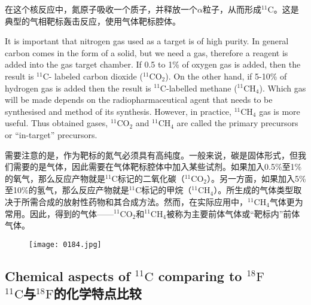 \documentclass[dvipsnames, svgnames,a4paper,11pt]{article}
\begin{document}
在这个核反应中，氮原子吸收一个质子，并释放一个$\alpha$粒子，从而形成${}^\mathrm{11}\mathrm{C}$。这是典型的气相靶标轰击反应，使用气体靶标腔体。

It is important that nitrogen gas used as a target is of high purity. In general carbon
comes in the form of a solid, but we need a gas, therefore a reagent is added into
the gas target chamber. If 0.5 to 1\% of oxygen gas is added, then the result is ${}^\mathrm{11}\mathrm{C}$-
labeled carbon dioxide (${}^\mathrm{11}\mathrm{CO_2}$). On the other hand, if 5-10\% of hydrogen gas is
added then the result is ${}^\mathrm{11}\mathrm{C}$-labelled methane (${}^\mathrm{11}\mathrm{CH_4}$). Which gas will be made
depends on the radiopharmaceutical agent that needs to be synthesised and method
of its synthesis. However, in practice, ${}^\mathrm{11}\mathrm{CH_4}$ gas is more useful. Thus obtained gases,
${}^\mathrm{11}\mathrm{CO_2}$ and ${}^\mathrm{11}\mathrm{CH_4}$ are called the primary precursors or “in-target” precursors.

需要注意的是，作为靶标的氮气必须具有高纯度。一般来说，碳是固体形式，但我们需要的是气体，因此需要在气体靶标腔体中加入某些试剂。如果加入0.5\%至1\%的氧气，那么反应产物就是${}^\mathrm{11}\mathrm{C}$标记的二氧化碳（${}^\mathrm{11}\mathrm{CO_2}$）。另一方面，如果加入5\%至10\%的氢气，那么反应产物就是${}^\mathrm{11}\mathrm{C}$标记的甲烷（${}^\mathrm{11}\mathrm{CH_4}$）。所生成的气体类型取决于所需合成的放射性药物和其合成方法。然而，在实际应用中，${}^\mathrm{11}\mathrm{CH_4}$气体更为常用。因此，得到的气体——${}^\mathrm{11}\mathrm{CO_2}$和${}^\mathrm{11}\mathrm{CH_4}$被称为主要前体气体或“靶标内”前体气体。

\begin{figure}[h]
	\centering
    \texttt{[image: 0184.jpg]}  
     \label{fig215}
\end{figure}

\subsection{Chemical aspects of ${}^\mathrm{11}\mathrm{C}$ comparing to ${}^\mathrm{18}\mathrm{F}$ \\${}^\mathrm{11}\mathrm{C}$与${}^\mathrm{18}\mathrm{F}$的化学特点比较}
\end{document}

